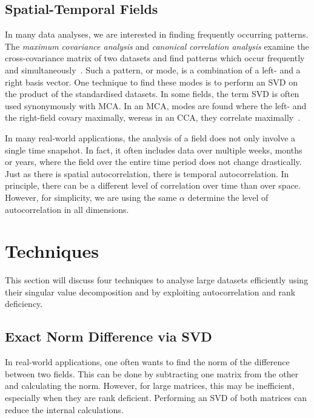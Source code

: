 \documentclass{acm_proc_article-sp}
\begin{document}
\subsection{Spatial-Temporal Fields}
\label{sec:Introduction Spatial-Temporal Fields}

In many data analyses, we are interested in finding frequently occurring patterns. The \textit{maximum covariance analysis} and \textit{canonical correlation analysis} examine the cross-covariance matrix of two datasets and find patterns which occur frequently and simultaneously~\cite{Eshel2011, Storch1999}. Such a pattern, or mode, is a combination of a left- and a right basis vector. One technique to find these modes is to perform an SVD on the product of the standardised datasets. In some fields, the term SVD is often used synonymously with MCA. In an MCA, modes are found where the left- and the right-field covary maximally, wereas in an CCA, they correlate maximally~\cite{Bretherton1992}.

In many real-world applications, the analysis of a field does not only involve a single time snapshot. In fact, it often includes data over multiple weeks, months or years, where the field over the entire time period does not change drastically. Just as there is spatial autocorrelation, there is temporal autocorrelation. In principle, there can be a different level of correlation over time than over space. However, for simplicity, we are using the same $\alpha$ determine the level of autocorrelation in all dimensions.

\section{Techniques}
\label{Techniques}

This section will discuss four techniques to analyse large datasets efficiently using their singular value decomposition and by exploiting autocorrelation and rank deficiency.

\subsection{Exact Norm Difference via SVD}
\label{sec:Techniques Exact Norm Difference via SVD}

In real-world applications, one often wants to find the norm of the difference between two fields. This can be done by subtracting one matrix from the other and calculating the norm. However, for large matrices, this may be inefficient, especially when they are rank deficient. Performing an SVD of both matrices can reduce the internal calculations.
\end{document}
